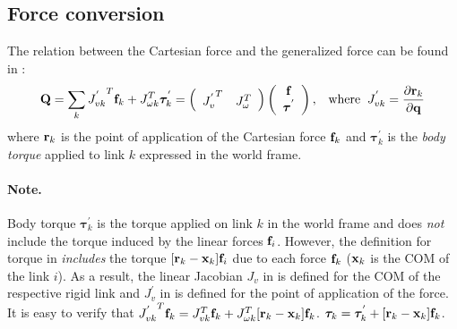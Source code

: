 \subsection{Force conversion}
The relation between the Cartesian force and the generalized force can
be found in :
\begin{equation}
\label{eq:force_conversion}
\mathbf{Q} = \sum_k {J^{'}_{vk}}^T \mathbf{f}_k + J_{\omega k}^T \bm{\tau}^{'}_k = 
\left (
\begin{array}{cc}
{J^{'}_{v}}^T & J_\omega^T
\end{array}
\right)
\left(
\begin{array}{c}
\mathbf{f} \\
\bm{\tau}^{'}
\end{array}
\right) 
, \;\;\;\mathrm{where}\;\;
J^{'}_{vk} = \frac{\partial \mathbf{r}_k}{\partial \mathbf{q}}
\end{equation}
where $\mathbf{r}_k$ is the point of application of the Cartesian force
$\mathbf{f}_k$ and $\bm{\tau}^{'}_k$ is the \emph{body torque} applied to link $k$ expressed in the world frame.

\paragraph{Note.} Body torque $\bm{\tau}^{'}_k$ is the torque
applied on link $k$ in the world frame and does \emph{not} include the torque induced by the linear forces $\mathbf{f}_i$. 
However, the definition for torque in  \emph{includes} the torque $[\mathbf{r}_k-\mathbf{x}_k] \mathbf{f}_i$ due to each force $\mathbf{f}_k$ ($\mathbf{x}_k$ is the COM of the link $i$). As a result, the linear Jacobian $J_{v}$ in  is defined for the COM of the respective rigid link and $J^{'}_{v}$ in  is defined for the point of application of the force. It is easy to verify that ${J^{'}_{vk}}^T\mathbf{f}_k = J_{vk}^T\mathbf{f}_k + J_{\omega k}^T[\mathbf{r}_k-\mathbf{x}_k] \mathbf{f}_k$. \ie $\bm{\tau}_k = \bm{\tau}^{'}_k + [\mathbf{r}_k-\mathbf{x}_k] \mathbf{f}_k$.

